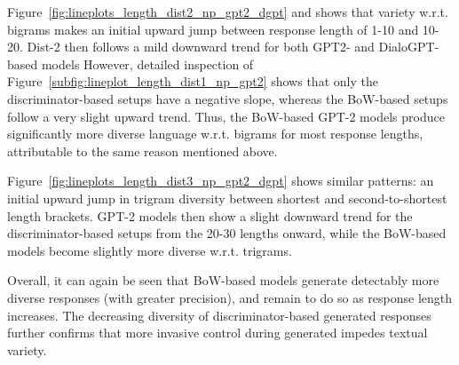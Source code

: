Figure~\ref{fig:lineplots_length_dist2_np_gpt2_dgpt} and shows that variety w.r.t. bigrams makes an initial upward jump between response length of 1-10 and 10-20. Dist-2 then follows a mild downward trend for both GPT2- and DialoGPT-based models However, detailed inspection of Figure~\ref{subfig:lineplot_length_dist1_np_gpt2} shows that only the discriminator-based setups have a negative slope, whereas the BoW-based setups follow a very slight upward trend. Thus, the BoW-based GPT-2 models produce significantly more diverse language w.r.t. bigrams for most response lengths, attributable to the same reason mentioned above.

Figure~\ref{fig:lineplots_length_dist3_np_gpt2_dgpt} shows similar patterns: an initial upward jump in trigram diversity between shortest and second-to-shortest length brackets. GPT-2 models then show a slight downward trend for the discriminator-based setups from the 20-30 lengths onward, while the BoW-based models become slightly more diverse w.r.t. trigrams.

Overall, it can again be seen that BoW-based models generate detectably more diverse responses (with greater precision), and remain to do so as response length increases. The decreasing diversity of discriminator-based generated responses further confirms that more invasive control during generated impedes textual variety.



